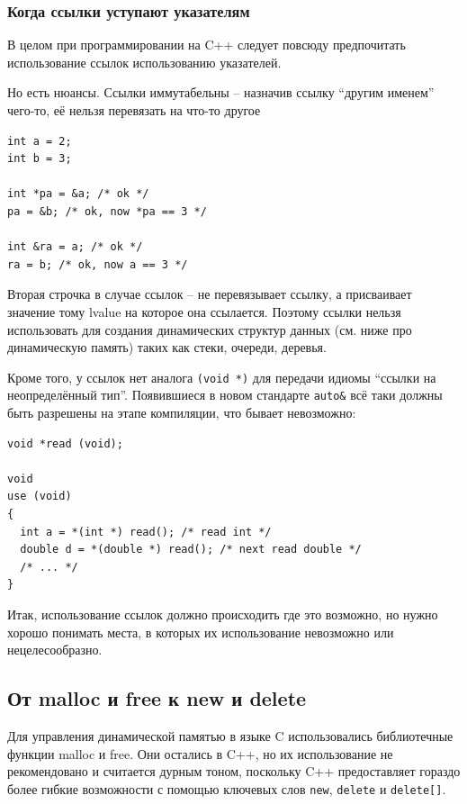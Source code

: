 \documentclass[a4paper,12pt,oneside]{article}
\begin{document}


\subsubsection{Когда ссылки уступают указателям}\label{PointersVsRefs}

В целом при программировании на C++ следует повсюду предпочитать использование ссылок использованию указателей.

Но есть нюансы. Ссылки иммутабельны -- назначив ссылку ``другим именем'' чего-то, её нельзя перевязать на что-то другое

\begin{lstlisting}
int a = 2;
int b = 3;

int *pa = &a; /* ok */
pa = &b; /* ok, now *pa == 3 */

int &ra = a; /* ok */
ra = b; /* ok, now a == 3 */
\end{lstlisting}

Вторая строчка в случае ссылок -- не перевязывает ссылку, а присваивает значение тому lvalue на которое она ссылается. Поэтому ссылки нельзя использовать для создания динамических структур данных (см. ниже про динамическую память) таких как стеки, очереди, деревья.

Кроме того, у ссылок нет аналога \lstinline!(void *)! для передачи идиомы ``ссылки на неопределённый тип''. Появившиеся в новом стандарте \lstinline!auto&! всё таки должны быть разрешены на этапе компиляции, что бывает невозможно:

\begin{lstlisting}
void *read (void);

void 
use (void)
{
  int a = *(int *) read(); /* read int */
  double d = *(double *) read(); /* next read double */
  /* ... */
}
\end{lstlisting}

Итак, использование ссылок должно происходить где это возможно, но нужно хорошо понимать места, в которых их использование невозможно или нецелесообразно.

\subsection{От malloc и free к new и delete}\label{newdelete}

Для управления динамической памятью в языке C использовались библиотечные функции malloc и free. Они остались в C++, но их использование не рекомендовано и считается дурным тоном, поскольку C++ предоставляет гораздо более гибкие возможности с помощью ключевых слов \lstinline!new!, \lstinline!delete! и \lstinline!delete[]!.
\end{document}
